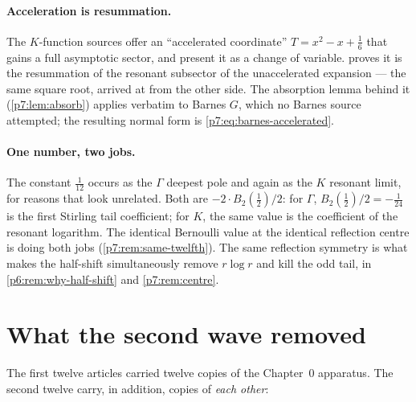 \documentclass[11pt,a4paper,oneside]{book}
\theoremstyle{plain}
\theoremstyle{definition}
\theoremstyle{remark}
\begin{document}
\paragraph{Acceleration is resummation.}
The $K$-function sources offer an ``accelerated coordinate''
$T=x^{2}-x+\tfrac16$ that gains a full asymptotic sector, and present it as a
change of variable.   proves it is
the resummation of the resonant subsector of the unaccelerated expansion ---
the same square root, arrived at from the other side.  The absorption lemma
behind it (\cref{p7:lem:absorb}) applies verbatim to Barnes $G$, which no
Barnes source attempted; the resulting normal form is
\eqref{p7:eq:barnes-accelerated}.

\paragraph{One number, two jobs.}
The constant $\tfrac1{12}$ occurs as the $\Gamma$ deepest pole and again as
the $K$ resonant limit, for reasons that look unrelated.  Both are
$-2\cdot B_2(\tfrac12)/2$: for $\Gamma$, $B_2(\tfrac12)/2=-\tfrac1{24}$ is the
first Stirling tail coefficient; for $K$, the same value is the coefficient of
the resonant logarithm.  The identical Bernoulli value at the identical
reflection centre is doing both jobs (\cref{p7:rem:same-twelfth}).  The same
reflection symmetry is what makes the half-shift simultaneously remove
$r\log r$ and kill the odd tail, in \cref{p6:rem:why-half-shift} and
\cref{p7:rem:centre}.

\section{What the second wave removed}
\label{p5:sec:second-dedup}

The first twelve articles carried twelve copies of the Chapter~0 apparatus.
The second twelve carry, in addition, copies of \emph{each other}:
\end{document}
